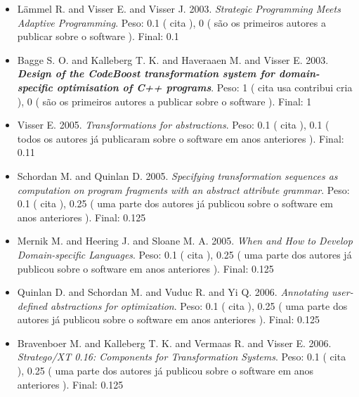 \begin{itemize}
\item L\"{a}mmel R. and Visser E. and Visser J.
      2003.
        \textit{ Strategic Programming Meets Adaptive Programming}.
      Peso:
      0.1 (
          cita
      ),
      0 (
são os primeiros autores a publicar sobre o software
      ).
      Final:
      0.1

\item Bagge S. O. and Kalleberg T. K. and Haveraaen M. and Visser E.
      2003.
        \textbf{\textit{ Design of the CodeBoost transformation system for domain-specific optimisation of C++ programs}}.
      Peso:
      1 (
          cita
          usa
          contribui
          cria
      ),
      0 (
são os primeiros autores a publicar sobre o software
      ).
      Final:
      1

\item Visser E.
      2005.
        \textit{ Transformations for abstractions}.
      Peso:
      0.1 (
          cita
      ),
      0.1 (
todos os autores já publicaram sobre o software em anos anteriores
      ).
      Final:
      0.11

\item Schordan M. and Quinlan D.
      2005.
        \textit{ Specifying transformation sequences as computation on program fragments with an abstract attribute grammar}.
      Peso:
      0.1 (
          cita
      ),
      0.25 (
uma parte dos autores já publicou sobre o software em anos anteriores
      ).
      Final:
      0.125

\item Mernik M. and Heering J. and Sloane M. A.
      2005.
        \textit{ When and How to Develop Domain-specific Languages}.
      Peso:
      0.1 (
          cita
      ),
      0.25 (
uma parte dos autores já publicou sobre o software em anos anteriores
      ).
      Final:
      0.125

\item Quinlan D. and Schordan M. and Vuduc R. and Yi Q.
      2006.
        \textit{ Annotating user-defined abstractions for optimization}.
      Peso:
      0.1 (
          cita
      ),
      0.25 (
uma parte dos autores já publicou sobre o software em anos anteriores
      ).
      Final:
      0.125

\item Bravenboer M. and Kalleberg T. K. and Vermaas R. and Visser E.
      2006.
        \textit{ Stratego/XT 0.16: Components for Transformation Systems}.
      Peso:
      0.1 (
          cita
      ),
      0.25 (
uma parte dos autores já publicou sobre o software em anos anteriores
      ).
      Final:
      0.125


\end{itemize}
